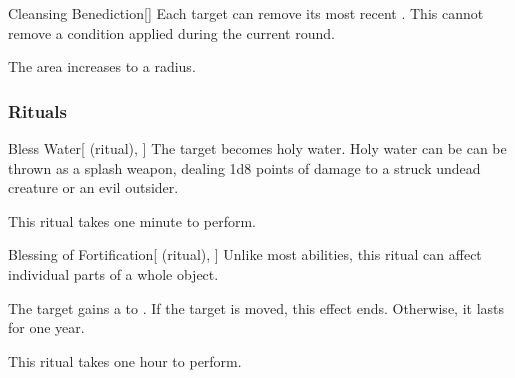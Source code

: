 \lowercase{\hypertarget{spell:Cleansing Benediction}{}}\label{spell:Cleansing Benediction}
\begin{freeability}[Rank 6]{\hypertarget{spell:Cleansing Benediction}{Cleansing Benediction}}[]
Each target can remove its most recent .
This cannot remove a condition applied during the current round.

\rankline
{} The area increases to a \arealarge radius.
\end{freeability}
\vspace{0.25em}



\subsubsection{Rituals}


\lowercase{\hypertarget{spell:Bless Water}{}}\label{spell:Bless Water}
\begin{attuneability}[Rank 1]{\hypertarget{spell:Bless Water}{Bless Water}}[ (ritual), ]
The target becomes holy water.
Holy water can be can be thrown as a splash weapon, dealing 1d8 points of damage to a struck undead creature or an evil outsider.

This ritual takes one minute to perform.
\end{attuneability}
\vspace{0.25em}



\lowercase{\hypertarget{spell:Blessing of Fortification}{}}\label{spell:Blessing of Fortification}
\begin{attuneability}[Rank 1]{\hypertarget{spell:Blessing of Fortification}{Blessing of Fortification}}[ (ritual), ]
Unlike most abilities, this ritual can affect individual parts of a whole object.

The target gains a   to .
If the target is moved, this effect ends.
Otherwise, it lasts for one year.

This ritual takes one hour to perform.
\end{attuneability}
\vspace{0.25em}



